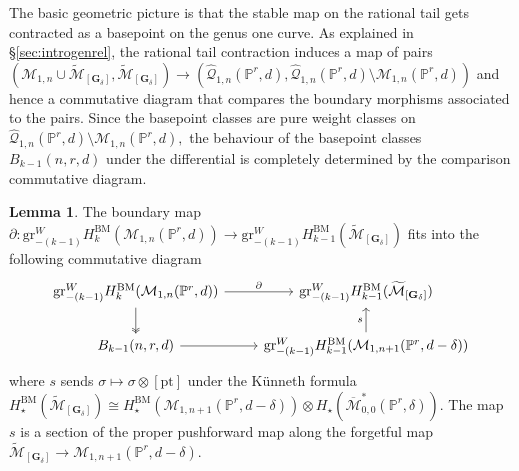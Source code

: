 \documentclass[12pt,reqno]{amsart}
\theoremstyle{definition}
\theoremstyle{definition}
\theoremstyle{definition}
\theoremstyle{definition}
\newtheorem{lemma}[theorem]{Lemma}
\newcommand{\ol}[1]{\overline{#1}}
\newcommand{\PP}{\mathbb{P}}
\newcommand{\Mcal}{\mathcal{M}}
\newcommand{\Mbar}{\ol{\Mcal}}
\newcommand{\Mtil}{\widetilde{\mathcal{M}}}
\newcommand{\gr}{\mathrm{gr}}
\begin{document}
The basic geometric picture is that the stable map on the rational tail gets contracted as a basepoint on the genus one curve. As explained in §\ref{sec:introgenrel}, the rational tail contraction induces a map of pairs $(\mathcal{M}_{1,n}\cup \Mtil_{[\mathbf{G}_{\delta}]},  \Mtil_{[\mathbf{G}_{\delta}]})\to (\hat{\mathcal{Q}}_{1,n}(\PP^r,d), \hat{\mathcal{Q}}_{1,n}(\PP^r,d)\setminus \mathcal{M}_{1,n}(\PP^r,d))$ and hence a commutative diagram that compares the boundary morphisms associated to the pairs. Since the basepoint classes are pure weight classes on $\hat{\mathcal{Q}}_{1,n}(\PP^r,d)\setminus \mathcal{M}_{1,n}(\PP^r,d),$ the behaviour of the basepoint classes $B_{k-1}(n,r,d)$ under the differential is completely determined by the comparison commutative diagram.

\begin{lemma}\label{lem:cobratail}
  The boundary map $\partial: \gr^W_{-(k-1)}H_k^{\mathrm{BM}}(\mathcal{M}_{1,n}(\PP^r,d))\to \mathrm{gr}^W_{-(k-1)}H_{k-1}^{\mathrm{BM}}(\Mtil_{[\mathbf{G}_{\delta}]})$ fits into the following commutative diagram \[\begin{tikzcd}
	{\gr^W_{-(k-1)}H_k^{\mathrm{BM}}(\mathcal{M}_{1,n}(\PP^r,d))} & {\gr^W_{-(k-1)}H_{k-1}^{\mathrm{BM}}(\Mtil_{[\mathbf{G}_{\delta}]})} \\
	{B_{k-1}(n,r,d)} & {\mathrm{gr}^W_{-(k-1)}H_{k-1}^{\mathrm{BM}}({\mathcal{M}}_{1,n+1}(\PP^r,d-\delta))} %
	\arrow["\partial", from=1-1, to=1-2]
	\arrow[two heads, from=1-1, to=2-1]
	\arrow["{s}", from=2-2, to=1-2]
	\arrow[from=2-1, to=2-2]
\end{tikzcd}\]where $s$ sends $\sigma\mapsto \sigma\otimes [\mathrm{pt}]$ under the Künneth formula $H_{\star}^{\mathrm{BM}}(\Mtil_{[\mathbf{G}_{\delta}]})\cong H^{\mathrm{BM}}_{\star}(\mathcal{M}_{1,n+1}(\PP^r,d-\delta))\otimes H_\star(\Mbar_{0,0}^*(\PP^r,\delta)).$ The map $s$ is a section of the proper pushforward map along the forgetful map $\Mtil_{[\mathbf{G}_{\delta}]}\to \mathcal{M}_{1,n+1}(\PP^r,d-\delta).$
\end{lemma}
\end{document}
